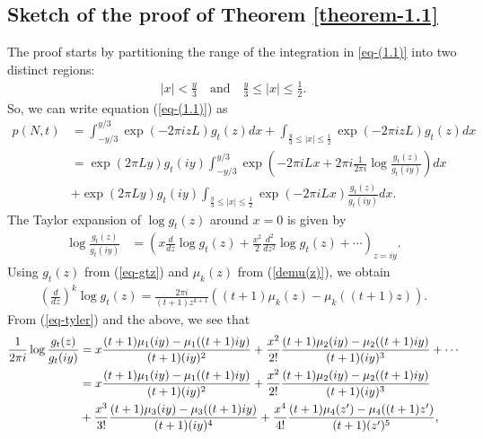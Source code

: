 \documentclass[11pt]{amsart}
\theoremstyle{plain}
\numberwithin{equation}{section}
\begin{document}
	\subsection{\texorpdfstring{Sketch of the proof of Theorem \ref{theorem-1.1}}{}}
	The proof starts by partitioning the range of the integration in \eqref{eq-(1.1)} into two distinct regions:
	\begin{align*}
		|x| < \frac{y}{3} \quad \text{and} \quad \frac{y}{3} \le |x| \le \frac{1}{2}.
	\end{align*}
	So, we can write equation (\ref{eq-(1.1)}) as
	\begin{equation}\label{eq-pNt}
		\begin{aligned}
			p(N,t)&=\int_{-y/3}^{y/3}\exp\left(-2\pi iz L\right)g_{t}(z)dx+\int_{\frac{y}{3}\le |x|\le \frac{1}{2}}\exp\left(-2\pi iz L\right)g_{t}(z)dx  \\
			&=\exp(2\pi Ly)g_{t}(iy)\int_{-y/3}^{y/3}\exp\left(-2\pi i Lx+2\pi i\frac{1}{2\pi i}\log\frac{g_{t}(z)}{g_{t}(iy)}\right)dx\\
			&+\exp(2\pi Ly)g_{t}(iy)\int_{\frac{y}{3}\le|x|\le \frac{1}{2}}\exp\left(-2\pi i Lx\right)\frac{g_{t}(z)}{g_{t}(iy)}dx.
		\end{aligned}
	\end{equation}
	The Taylor expansion of $\log g_t(z)$ around $x=0$ is given by
	\begin{align}\label{eq-tyler}
		\log \frac{g_{t}(z)}{g_{t}(iy)}&=\left(x\frac{d}{dz} \log g_{t}(z)+\frac{x^{2}}{2}\frac{d^{2}}{dz^{2}}\log g_{t}(z)+\cdots\right)_{z=iy}.
	\end{align}
	Using $g_t(z)$ from (\ref{eq-gtz}) and $\mu_k(z)$ from (\ref{demu(z)}), we obtain
	\begin{align*}
		\left(\frac{d}{dz}\right)^{k}\log g_{t}(z)=\frac{2\pi i}{(t+1)z^{k+1}}((t+1)\mu_{k}(z)-\mu_{k}((t+1)z)).
	\end{align*}
	From (\ref{eq-tyler}) and the above, we see that 
	\begin{align}\label{eq-taylor}
		\notag
		\frac{1}{2\pi i}\log \frac{g_{t}(z)}{g_{t}(iy)}&=x\frac{(t+1)\mu_{1}(iy)-\mu_{1}((t+1)iy)}{(t+1)(iy)^{2}}+\frac{x^{2}}{2!}\frac{(t+1)\mu_{2}(iy)-\mu_{2}((t+1)iy)}{(t+1)(iy)^{3}}+\cdots \\
		&=x\frac{(t+1)\mu_{1}(iy)-\mu_{1}((t+1)iy)}{(t+1)(iy)^{2}}+\frac{x^{2}}{2!}\frac{(t+1)\mu_{2}(iy)-\mu_{2}((t+1)iy)}{(t+1)(iy)^{3}}\\
		\notag
		&+\frac{x^{3}}{3!}\frac{(t+1)\mu_{3}(iy)-\mu_{3}((t+1)iy)}{(t+1)(iy)^{4}}+\frac{x^{4}}{4!}\frac{(t+1)\mu_{4}(z^{\prime})-\mu_{4}((t+1)z^{\prime})}{(t+1)(z^{\prime})^{5}},
	\end{align}
\end{document}
